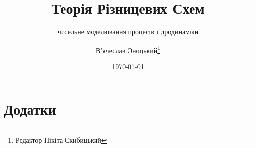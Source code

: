 \documentclass[a4paper,11pt,twoside=semi,numbers=noenddot]{scrbook}
\title{Теорія Різницевих Схем}
\subtitle{чисельне моделювання процесів гідродинаміки}
\author{В'ячеслав Оноцький\thanks{Редактор Нікіта Скибицький}}
\date{\today}
\begin{document}
\frontmatter
\maketitle
\tableofcontents


\mainmatter












\backmatter
\chapter{Додатки}

\newpage

\newpage

\end{document}
